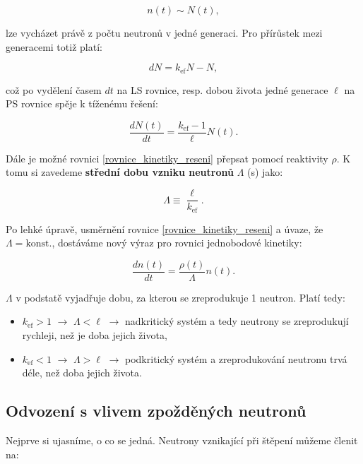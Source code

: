 $$ n(t) \sim N(t), $$

lze vycházet právě z počtu neutronů v jedné generaci. Pro přírůstek mezi generacemi totiž platí:

$$ dN = k_{\text{ef}}N - N, $$

což po vydělení časem $dt$ na LS rovnice, resp. dobou života jedné generace $\ell$ na PS rovnice spěje k tíženému řešení:

$$ \dfrac{dN(t)}{dt} = \dfrac{k_{\text{ef}} - 1}{\ell} N(t). $$

Dále je možné rovnici \eqref{rovnice_kinetiky_reseni} přepsat pomocí reaktivity $\rho$. K tomu si zavedeme \textbf{střední dobu vzniku neutronů} $\Lambda$ (s) jako:

\begin{equation}
  \boxed{
  \Lambda \equiv \dfrac{\ell}{k_{\text{ef}}}.
  \label{stredni_doba_vzniku}}
\end{equation}

Po lehké úpravě, usměrnění rovnice \eqref{rovnice_kinetiky_reseni} a úvaze, že $\Lambda = \text{konst.}$, dostáváme nový výraz pro rovnici jednobodové kinetiky:

\begin{equation}
  \boxed{
  \dfrac{dn(t)}{dt} = \dfrac{\rho (t)}{\Lambda} n(t).
  \label{rovnice_kinetiky_reaktivita}}
\end{equation}

$\Lambda$ v podstatě vyjadřuje dobu, za kterou se zreprodukuje 1 neutron. Platí tedy:

\begin{itemize}
  \item $k_{\text{ef}} > 1$ $\rightarrow$ $\Lambda < \ell$ $\rightarrow$ nadkritický systém a tedy neutrony se zreprodukují rychleji, než je doba jejich života,
  \item $k_{\text{ef}} < 1$ $\rightarrow$ $\Lambda > \ell$ $\rightarrow$ podkritický systém a zreprodukování neutronu trvá déle, než doba jejich života.
\end{itemize}

\subsection{Odvození s vlivem zpožděných neutronů}

Nejprve si ujasníme, o co se jedná. Neutrony vznikající při štěpení můžeme členit na:

